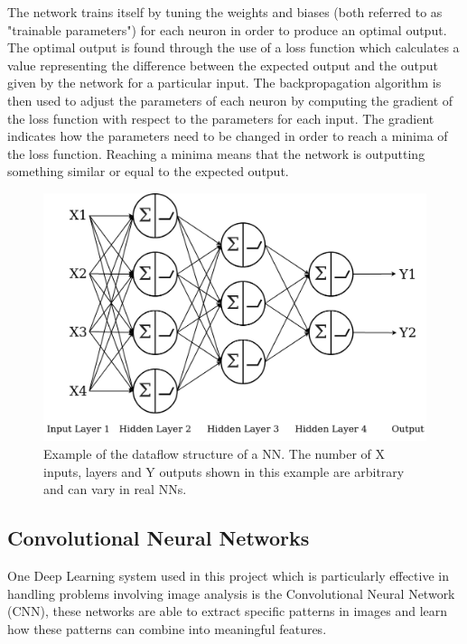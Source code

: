 \documentclass{l4proj}
\begin{document}
The network trains itself by tuning the weights and biases (both referred to as "trainable parameters") for each neuron in order to produce an optimal output. The optimal output is found through the use of a loss function which calculates a value representing the difference between the expected output and the output given by the network for a particular input. The backpropagation algorithm is then used to adjust the parameters of each neuron by computing the gradient of the loss function with respect to the parameters for each input. The gradient indicates how the parameters need to be changed in order to reach a minima of the loss function. Reaching a minima means that the network is outputting something similar or equal to the expected output. 

\begin{figure}[h]
    \centering
    \includegraphics[width=1.0\linewidth]{images/NeuralNet.png}    

    \caption{Example of the dataflow structure of a NN. The number of X inputs, layers and Y outputs shown in this example are arbitrary and can vary in real NNs.}

    \label{fig:neuralnet} 
\end{figure}

\subsection{Convolutional Neural Networks}
\label{convolution}
One Deep Learning system used in this project which is particularly effective in handling problems involving image analysis is the Convolutional Neural Network (CNN), these networks are able to extract specific patterns in images and learn how these patterns can combine into meaningful features.
\end{document}
